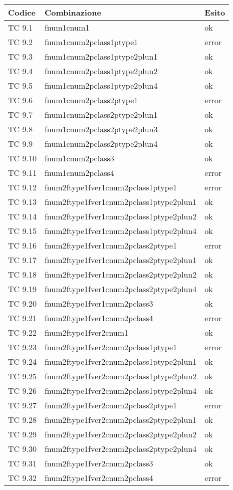 \begin{longtable}{|p{3cm}|p{7cm}|p{3cm}|}
	\hline
	\rowcolor{Gray}
	\textbf{Codice} & \textbf{Combinazione} & \textbf{Esito}\tabularnewline
	\hline
	TC 9.1			& fnum1cnum1					& ok \tabularnewline
	\hline
	TC 9.2			& fnum1cnum2pclass1ptype1			& error \tabularnewline
	\hline
	TC 9.3			& fnum1cnum2pclass1ptype2plun1			& ok \tabularnewline
	\hline
	TC 9.4			& fnum1cnum2pclass1ptype2plun2			& ok \tabularnewline
	\hline
	TC 9.5			& fnum1cnum2pclass1ptype2plun4			& ok \tabularnewline
	\hline
	TC 9.6			& fnum1cnum2pclass2ptype1			& error \tabularnewline
	\hline
	TC 9.7			& fnum1cnum2pclass2ptype2plun1			& ok \tabularnewline
	\hline
	TC 9.8			& fnum1cnum2pclass2ptype2plun3			& ok \tabularnewline
	\hline
	TC 9.9			& fnum1cnum2pclass2ptype2plun4			& ok \tabularnewline
	\hline
	TC 9.10			& fnum1cnum2pclass3				& ok \tabularnewline
	\hline
	TC 9.11			& fnum1cnum2pclass4				& error \tabularnewline
	\hline
	TC 9.12			& fnum2ftype1fver1cnum2pclass1ptype1		& error \tabularnewline
	\hline
	TC 9.13			& fnum2ftype1fver1cnum2pclass1ptype2plun1	& ok \tabularnewline
	\hline
	TC 9.14			& fnum2ftype1fver1cnum2pclass1ptype2plun2	& ok \tabularnewline
	\hline
	TC 9.15			& fnum2ftype1fver1cnum2pclass1ptype2plun4	& ok \tabularnewline
	\hline
	TC 9.16			& fnum2ftype1fver1cnum2pclass2ptype1		& error \tabularnewline
	\hline
	TC 9.17			& fnum2ftype1fver1cnum2pclass2ptype2plun1	& ok \tabularnewline
	\hline
	TC 9.18			& fnum2ftype1fver1cnum2pclass2ptype2plun2	& ok \tabularnewline
	\hline
	TC 9.19			& fnum2ftype1fver1cnum2pclass2ptype2plun4	& ok \tabularnewline
	\hline
	TC 9.20			& fnum2ftype1fver1cnum2pclass3			& ok \tabularnewline
	\hline
	TC 9.21			& fnum2ftype1fver1cnum2pclass4			& error \tabularnewline
	\hline
	TC 9.22			& fnum2ftype1fver2cnum1				& ok \tabularnewline
	\hline
	TC 9.23			& fnum2ftype1fver2cnum2pclass1ptype1		& error \tabularnewline
	\hline
	TC 9.24			& fnum2ftype1fver2cnum2pclass1ptype2plun1	& ok \tabularnewline
	\hline
	TC 9.25			& fnum2ftype1fver2cnum2pclass1ptype2plun2	& ok \tabularnewline
	\hline
	TC 9.26			& fnum2ftype1fver2cnum2pclass1ptype2plun4	& ok \tabularnewline
	\hline
	TC 9.27			& fnum2ftype1fver2cnum2pclass2ptype1		& error \tabularnewline
	\hline
	TC 9.28			& fnum2ftype1fver2cnum2pclass2ptype2plun1	& ok \tabularnewline
	\hline
	TC 9.29			& fnum2ftype1fver2cnum2pclass2ptype2plun2	& ok \tabularnewline
	\hline
	TC 9.30			& fnum2ftype1fver2cnum2pclass2ptype2plun4	& ok \tabularnewline
	\hline
	TC 9.31			& fnum2ftype1fver2cnum2pclass3			& ok \tabularnewline
	\hline
	TC 9.32			& fnum2ftype1fver2cnum2pclass4			& error \tabularnewline

\end{longtable}

